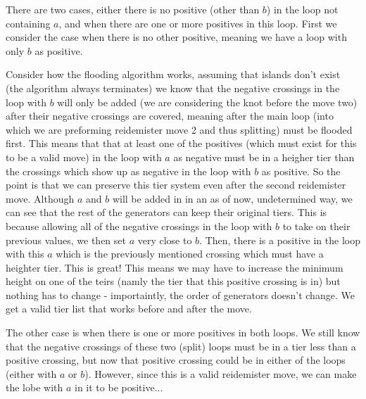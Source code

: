 \documentclass[11pt,oneside]{amsart}
\begin{document}
There are two cases, either there is no positive (other than $b$) in the loop not containing $a$, and when there are one or more positives in this loop. First we consider the case when there is no other positive, meaning we have a loop with only $b$ as positive. 

Consider how the flooding algorithm works, assuming that islands don't exist (the algorithm always terminates) we know that the negative crossings in the loop with $b$ will only be added (we are considering the knot before the move two) after their negative crossings are covered, meaning after the main loop (into which we are preforming reidemister move 2 and thus splitting) must be flooded first. This means that that at least one of the positives (which must exist for this to be a valid move) in the loop with $a$ as negative must be in a heigher tier than the crossings which show up as negative in the loop with $b$ as positive. So the point is that we can preserve this tier system even after the second reidemister move. Although $a$ and $b$ will be added in in an as of now, undetermined way, we can see that the rest of the generators can keep their original tiers. This is because allowing all of the negative crossings in the loop with $b$ to take on their previous values, we then set $a$ very close to $b$. Then, there is a positive in the loop with this $a$ which is the previously mentioned crossing which must have a heighter tier. This is great! This means we may have to increase the minimum height on one of the teirs (namly the tier that this positive crossing is in) but nothing has to change - importaintly, the order of generators doesn't change. We get a valid tier list that works before and after the move.

The other case is when there is one or more positives in both loops. We still know that the negative crossings of these two (split) loops must be in a tier less than a positive crossing, but now that positive crossing could be in either of the loops (either with $a$ or $b$). However, since this is a valid reidemister move, we can make the lobe with $a$ in it to be positive...
\end{document}
